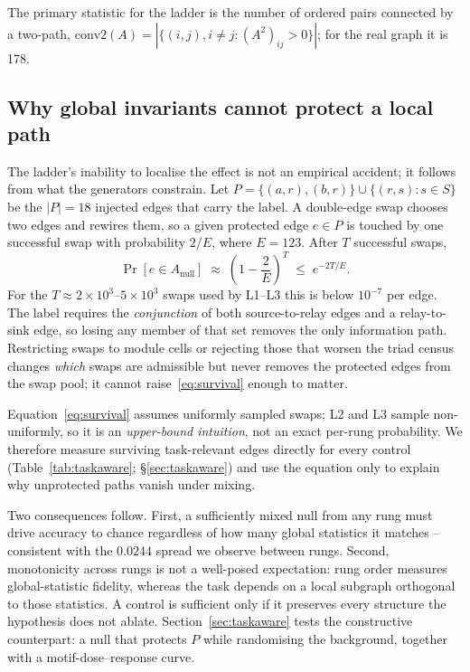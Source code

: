 \documentclass[10pt,twocolumn,letterpaper]{article}
\begin{document}
The primary statistic for the ladder is the number of ordered pairs connected
by a two-path, $\mathrm{conv2}(A) = |\{(i,j), i\ne j : (A^2)_{ij}>0\}|$;
for the real graph it is 178.

\subsection{Why global invariants cannot protect a local path}
\label{sec:theory}

The ladder's inability to localise the effect is not an empirical accident;
it follows from what the generators constrain. Let
$P=\{(a,r),(b,r)\}\cup\{(r,s): s\in S\}$ be the $|P|=18$ injected edges that
carry the label. A double-edge swap chooses two edges and rewires them, so a
given protected edge $e\in P$ is touched by one successful swap with
probability $2/E$, where $E=123$. After $T$ successful swaps,
\begin{equation}
\Pr[e\in A_{\text{null}}]\;\approx\;\left(1-\frac{2}{E}\right)^{T}
\;\le\;e^{-2T/E}.
\label{eq:survival}
\end{equation}
For the $T\!\approx\!2\!\times\!10^{3}$--$5\!\times\!10^{3}$ swaps used by
L1--L3 this is below $10^{-7}$ per edge. The label requires the
\emph{conjunction} of both source-to-relay edges and a relay-to-sink edge, so
losing any member of that set removes the only information path. Restricting
swaps to module cells or rejecting those that worsen the triad census changes
\emph{which} swaps are admissible but never removes the protected edges from
the swap pool; it cannot raise~\eqref{eq:survival} enough to matter.

Equation~\eqref{eq:survival} assumes uniformly sampled swaps; L2 and L3 sample
non-uniformly, so it is an \emph{upper-bound intuition}, not an exact per-rung
probability. We therefore measure surviving task-relevant edges directly for
every control (Table~\ref{tab:taskaware}; \S\ref{sec:taskaware}) and use the
equation only to explain why unprotected paths vanish under mixing.

Two consequences follow. First, a sufficiently mixed null from any rung must
drive accuracy to chance regardless of how many global statistics it matches
-- consistent with the $0.0244$ spread we observe between rungs. Second,
monotonicity across rungs is not a well-posed expectation: rung order
measures global-statistic fidelity, whereas the task depends on a local
subgraph orthogonal to those statistics. A control is sufficient only if it
preserves every structure the hypothesis does not ablate. Section~\ref{sec:taskaware}
tests the constructive counterpart: a null that protects $P$ while randomising
the background, together with a motif-dose--response curve.
\end{document}
